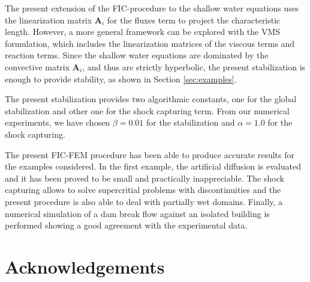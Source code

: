 \documentclass[a4paper,12pt]{article}
\newcommand\IgnasiCorregit[1]{\ifthenelse{\boolean{show_corregit}}{\textcolor{blue}{#1}}{}}
\newcommand\Miguel[1]{\ifthenelse{\boolean{show_corregit}}{\textcolor{red}{#1}}{}}
\begin{document}
The present extension of the FIC-procedure to the shallow water equations uses the linearization matrix $\mathbf{A}_i$ for the fluxes term to project the characteristic length. However, a more general framework can be explored with the VMS formulation, which includes the linearization matrices of the viscous terms and reaction terms. Since the shallow water equations are dominated by the convective matrix $\mathbf{A}_i$, and thus are strictly hyperbolic, the present stabilization is enough to provide stability, as shown in Section \ref{sec:examples}.

The present stabilization provides two algorithmic constants, one for the global stabilization and other one for the shock capturing term. From our numerical experiments, we have chosen $\beta=0.01$ for the stabilization and $\alpha=1.0$ for the shock capturing. \IgnasiCorregit{REVISA QUE NO HAGIS REPETIT EL SIMBOL $\alpha$ PER A VARIS SIGNIFICATS}

The present FIC-FEM procedure has been able to produce accurate results for the examples considered.
In the first example, the artificial diffusion is evaluated and it has been proved to be small and practically inappreciable. The shock capturing allows to solve supercritial problems with discontinuities and the present procedure is also able to deal with partially wet domains. Finally, a numerical simulation of a dam break flow against an isolated building is performed showing a good agreement with the experimental data.
\IgnasiCorregit{JO AFEGIRIA UN PETIT PARAGRAF RESUMINT ELS RESULTATS OBTINGUTS ALS EXEMPLES. (NO DETALLAT, NOMES UNES PINCELLADES)}



\section{Acknowledgements}
\end{document}
